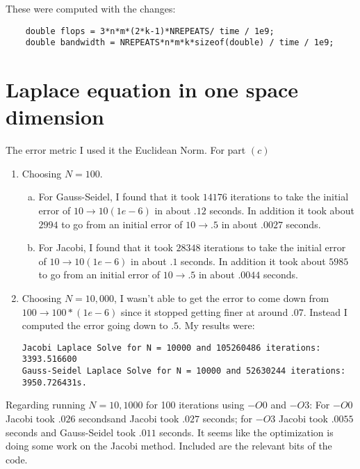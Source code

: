 \documentclass[12pt]{article}
\begin{document}
These were computed with the changes:

\begin{verbatim}
    double flops = 3*n*m*(2*k-1)*NREPEATS/ time / 1e9; 
    double bandwidth = NREPEATS*n*m*k*sizeof(double) / time / 1e9; 
\end{verbatim}


\section{Laplace equation in one space dimension}

The error metric I used it the Euclidean Norm. For part $(c)$

\begin{enumerate}[1.]

\item Choosing $N = 100$. 

\begin{enumerate}[(a)]

\item For Gauss-Seidel, I found that it took $14176$ iterations to take the
initial error of $10 \to 10(1e-6)$ in about $.12$ seconds. In addition it took
about $2994$ to go from an initial error of $10 \to .5$ in about $.0027$
seconds.

\item For Jacobi, I found that it took $28348$ iterations to take the
initial error of $10 \to 10(1e-6)$ in about $.1$ seconds. In addition it took
about $5985$ to go from an initial error of $10 \to .5$ in about $.0044$
seconds.

\end{enumerate}

\item Choosing $N = 10,000$, I wasn't able to get the error to come down from
$100 \to 100*(1e-6)$ since it stopped getting finer at around $.07$. Instead I
computed the error going down to $.5$. My results were: 

\begin{verbatim}
Jacobi Laplace Solve for N = 10000 and 105260486 iterations: 3393.516600
Gauss-Seidel Laplace Solve for N = 10000 and 52630244 iterations: 3950.726431s.
\end{verbatim}

\end{enumerate}

Regarding running $N = 10,1000$ for 100 iterations using $-O0$ and $-O3$: For
$-O0$ Jacobi took $.026$ secondsand Jacobi took $.027$ seconds; for $-O3$ Jacobi
took $.0055$ seconds and Gauss-Seidel took $.011$ seconds. It seems like the
optimization is doing some work on the Jacobi method. Included are the relevant
bits of the code.
\end{document}
